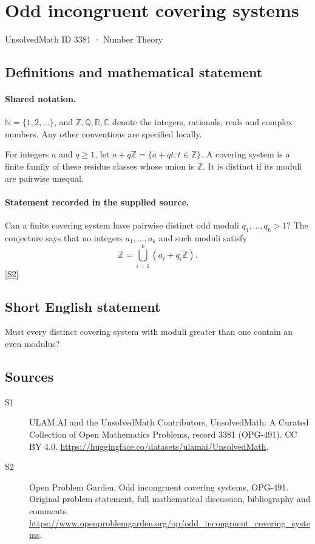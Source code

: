 \documentclass[11pt]{article}
\newcommand{\sref}[2]{\hyperlink{source:#1:#2}{[S#2]}}
\begin{document}
\setcounter{section}{3380}
\section{Odd incongruent covering systems}\label{3381}
{\small\sffamily UnsolvedMath ID 3381 · Number Theory}
\subsection{Definitions and mathematical statement}

\paragraph{Shared notation.}$\mathbb N=\{1,2,\ldots\}$, and $\mathbb Z,\mathbb Q,\mathbb R,\mathbb C$ denote the integers, rationals, reals and complex numbers. Any other conventions are specified locally.


For integers $a$ and $q\ge1$, let $a+q\mathbb Z=\{a+qt:t\in\mathbb Z\}$. A covering system is a finite family of these residue classes whose union is $\mathbb Z$. It is distinct if its moduli are pairwise unequal.
\paragraph{Statement recorded in the supplied source.}
Can a finite covering system have pairwise distinct odd moduli $q_1,\ldots,q_k>1$? The conjecture says that no integers $a_1,\ldots,a_k$ and such moduli satisfy
\[
 \mathbb Z=\bigcup_{i=1}^k(a_i+q_i\mathbb Z).
\] \sref{3381}{2}
\subsection{Short English statement}
Must every distinct covering system with moduli greater than one contain an even modulus?
\subsection{Sources}
\begin{description}
\item[\hypertarget{source:3381:1}{S1}] ULAM.AI and the UnsolvedMath Contributors, UnsolvedMath: A Curated Collection of Open Mathematics Problems, record 3381 (OPG-491). CC BY 4.0. \url{https://huggingface.co/datasets/ulamai/UnsolvedMath}.
\item[\hypertarget{source:3381:2}{S2}] Open Problem Garden, Odd incongruent covering systems, OPG-491. Original problem statement, full mathematical discussion, bibliography and comments. \url{https://www.openproblemgarden.org/op/odd_incongruent_covering_systems}.
\end{description}
\label{end:3381}
\end{document}
